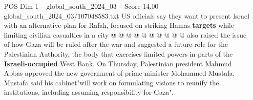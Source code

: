 \begin{textsample}{POS Dim 1 – global\_south\_2024\_03 – Score 14.00 – global\_south\_2024\_03/107048583.txt}
US officials say they want to present Israel with an alternative plan for Rafah, focused on striking Hamas \textbf{targets} while limiting civilian casualties in a city @ @ @ @ @ @ @ @ @ @ also raised the issue of how Gaza will be ruled after the war and suggested a future role for the Palestinian Authority, the body that exercises limited powers in parts of the \textbf{Israeli-occupied} West Bank.
On Thursday, Palestinian president Mahmud Abbas approved the new government of prime minister Mohammed Mustafa.
Mustafa said his cabinet"will work on formulating visions to reunify the institutions, including assuming responsibility for Gaza".

\end{textsample}

